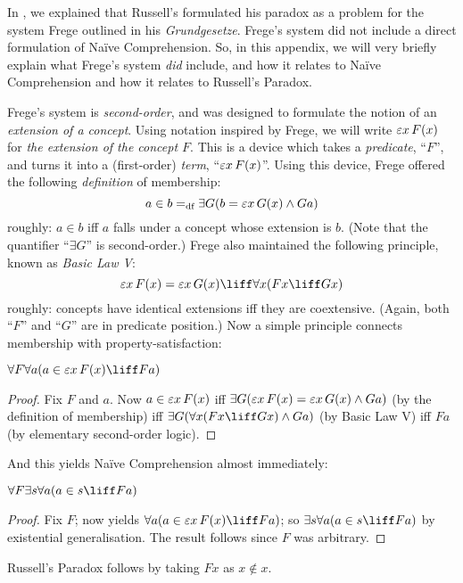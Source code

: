 \documentclass[../../../include/open-logic-section]{subfiles}
\begin{document}


In , we explained that Russell's formulated his
paradox as a problem for the system Frege outlined in his
\emph{Grundgesetze}. Frege's system did not include a direct
formulation of Na\"{i}ve Comprehension. So, in this appendix, we will
very briefly explain what Frege's system \emph{did} include, and how
it relates to Na\"ive Comprehension and how it relates to Russell's
Paradox.

Frege's system is \emph{second-order}, and was designed to formulate
the notion of an \emph{extension of a concept}. Using notation
inspired by Frege, we will write $\fregeext{x}{F(x)}$ for \emph{the extension
of the concept $F$}. This is a device which takes a \emph{predicate},
``$F$'', and turns it into a (first-order) \emph{term},
``$\fregeext{x}{F(x)}$''. Using this device, Frege offered the following
\emph{definition} of membership:
\[
	a \in b =_\text{df} \exists G(b = \fregeext{x}{G(x)} \land Ga)
\]
roughly: $a \in b$ iff $a$ falls under a concept whose extension is
$b$. (Note that the quantifier ``$\exists G$'' is second-order.) Frege
also maintained the following principle, known as \emph{Basic Law V}: 
$$\fregeext{x}{F(x)} = \fregeext{x}{G(x)} \liff \forall x (Fx \liff Gx)$$
roughly: concepts have identical extensions iff they are coextensive. (Again, both ``$F$'' and ``$G$'' are in predicate position.) Now a simple principle connects membership with property-satisfaction:

\begin{lem}
$\forall F \forall a(a \in \fregeext{x}{F(x)} \liff Fa)$
\end{lem}

\begin{proof} 
Fix $F$ and $a$. Now $a \in \fregeext{x}{F(x)}$ iff $\exists G(\fregeext{x}{F(x)}
= \fregeext{x}{G(x)} \land Ga)$ (by the definition of membership) iff
$\exists G(\forall x(Fx \liff Gx) \land Ga)$ (by Basic Law V) iff $Fa$
(by elementary second-order logic).
\end{proof}

And this yields Na\"ive Comprehension almost immediately:

\begin{lem}
$\forall F \exists s \forall a (a \in s \liff Fa)$
\end{lem}

\begin{proof}
Fix $F$; now  yields $\forall a (a \in
\fregeext{x}{F(x)} \liff Fa)$; so $\exists s\forall a(a \in s \liff Fa)$ by
existential generalisation. The result follows since $F$ was
arbitrary.
\end{proof}

Russell's Paradox follows by taking $Fx$ as $x \notin x$. 
\end{document}

